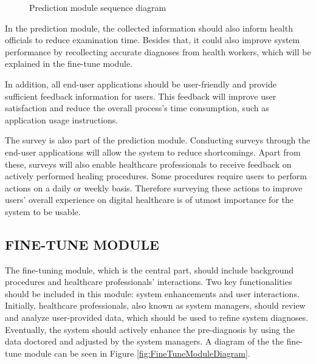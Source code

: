 \begin{figure}[htbp]
\centering
{}
\caption{Prediction module sequence diagram}
\label{fig:PredictionModuleSequenceDiagram}
\end{figure}

In the prediction module, the collected information should also inform health officials to reduce examination time. Besides that, it could also improve system performance by recollecting accurate diagnoses from health workers, which will be explained in the fine-tune module.

In addition, all end-user applications should be user-friendly and provide sufficient feedback information for users. This feedback will improve user satisfaction and reduce the overall process's time consumption, such as application usage instructions.

The survey is also part of the prediction module. Conducting surveys through the end-user applications will allow the system to reduce shortcomings. Apart from these, surveys will also enable healthcare professionals to receive feedback on actively performed healing procedures. Some procedures require users to perform actions on a daily or weekly basis. Therefore surveying these actions to improve users' overall experience on digital healthcare is of utmost importance for the system to be usable.

\subsection{ FINE-TUNE MODULE }

The fine-tuning module, which is the central part, should include background procedures and healthcare professionals' interactions. Two key functionalities should be included in this module: system enhancements and user interactions. Initially, healthcare professionals, also known as system managers, should review and analyze user-provided data, which should be used to refine system diagnoses. Eventually, the system should actively enhance the pre-diagnosis by using the data doctored and adjusted by the system managers. A diagram of the the fine-tune module can be seen in Figure \ref{fig:FineTuneModuleDiagram}.


